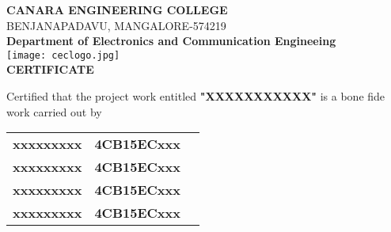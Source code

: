 \documentclass[11pt,a4paper]{article}
\begin{document}
 \begin{center}
 \large {\textbf{CANARA ENGINEERING COLLEGE}} \\
 \scriptsize{BENJANAPADAVU, MANGALORE-574219} \\
 \normalsize{\textbf{Department of Electronics and Communication Engineeing }}\\
 \vspace{0.2in}
 \texttt{[image: ceclogo.jpg]}\\
 \vspace{0.2in}
 \large{\textbf{CERTIFICATE}}\\
 \vspace{0.01in}
 \end{center}
 
Certified that the project work entitled \textbf{"XXXXXXXXXXX"} is a bone fide work carried out by\\
\begin{tabular}{l l l}
\textbf{xxxxxxxxx}  & \hspace{3in} \textbf{4CB15ECxxx}\\
\textbf{xxxxxxxxx}  & \hspace{3in} \textbf{4CB15ECxxx}\\
\textbf{xxxxxxxxx}  & \hspace{3in} \textbf{4CB15ECxxx}\\
\textbf{xxxxxxxxx}  & \hspace{3in} \textbf{4CB15ECxxx}\\
\end{tabular}\\
\end{document}
